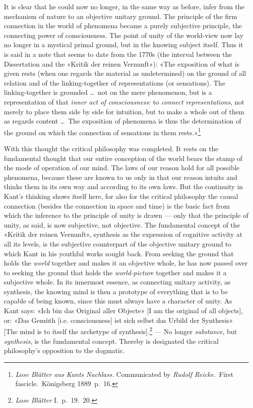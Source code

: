 \documentclass[12pt,a4paper]{article}
\newcommand{\opage}[1]{\marginnote{\footnotesize\textit{[#1]}}}
\begin{document}
It is clear that he could now no longer, in the same way as before, infer
from the mechanism of nature to an objective unitary ground. The principle
of the firm connection in the world of phenomena became a purely
subjective principle, the connecting power of consciousness. The point of
unity of the world-view now lay no longer in a mystical primal ground, but
in the knowing subject itself. Thus it is said in a note that seems to
date from the 1770s (the interval between the Dissertation and the «Kritik
der reinen Vernunft»): «The exposition of what is given rests (when one
regards the material as undetermined) on the ground of all relation and of
the linking-together of representations (or sensations). The
linking-together is grounded \ldots\ not on the mere phenomenon, but is a
representation of \opage{15}that \emph{inner act of consciousness}: to \emph{connect
representations}, not merely to place them side by side for intuition, but
to make a whole out of them as regards content \ldots\ The exposition of
phenomena is thus the determination of the ground on which the connection
of sensations in them rests.»\footnote{\textit{Lose Blätter aus Kants
Nachlass.} Communicated by \emph{Rudolf Reicke}.\ First fascicle.\ Königsberg
1889\ p.\ 16.}

With this thought the critical philosophy was completed. It rests on the
fundamental thought that our entire conception of the world bears the
stamp of the mode of operation of our mind. The laws of our reason hold
for all possible phenomena, because these are known to us only in that our
reason intuits and thinks them in its own way and according to its own
laws. But the continuity in Kant's thinking shows itself here, for also
for the critical philosophy the causal connection (besides the connection
in space and time) is the basic fact from which the inference to the
principle of unity is drawn --- only that the principle of unity, as said,
is now subjective, not objective. The fundamental concept of the «Kritik
der reinen Vernunft», synthesis as the expression of cognitive activity at
all its levels, is the subjective counterpart of the objective unitary
ground to which Kant in his youthful works sought back. From seeking the
ground that holds the \emph{world} together and makes it an objective whole, he
has now passed over to seeking the ground that holds the \emph{world-picture}
together and makes it a subjective whole. In its innermost essence, as
connecting unitary activity, as synthesis, the knowing mind is then a
prototype of everything that is to be capable of being known, since this
must always have a character of unity. As Kant says: «Ich bin das Original
aller Objecte» [I am the original of all objects], or: «Das Gemüth [i.e.
consciousness] ist sich selbst das Urbild der Synthesis» [The mind is to
itself the archetype of synthesis].\footnote{\textit{Lose Blätter} I.\
p.\ 19.\ 20.} --- No longer \emph{substance}, but \emph{synthesis}, is the fundamental
concept. Thereby is designated the critical philosophy's opposition to the
dogmatic.
\end{document}
